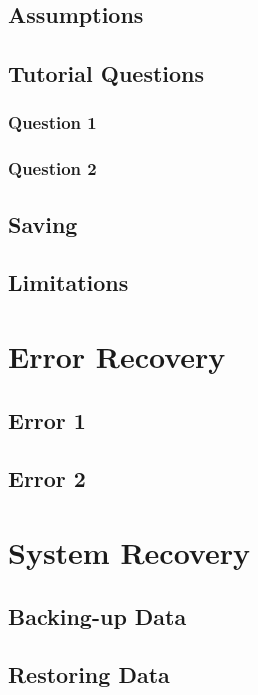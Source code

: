 \subsection{Assumptions}

\subsection{Tutorial Questions}

\subsubsection{Question 1}

\subsubsection{Question 2}

\subsection{Saving}

\subsection{Limitations}

\section{Error Recovery}

\subsection{Error 1}

\subsection{Error 2}

\section{System Recovery}

\subsection{Backing-up Data}

\subsection{Restoring Data}